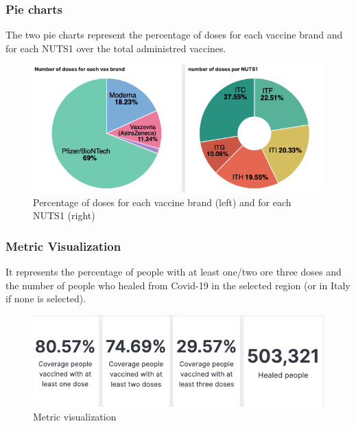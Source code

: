 \documentclass[12pt, a4paper]{article}
\begin{document}
\subsubsection{Pie charts}
The two pie charts represent the percentage of doses for each vaccine brand and for each NUTS1 over the total administred vaccines.
\begin{figure}[ht]
  \centering
  \includegraphics[width=1\linewidth]{img (7).png}
\caption*{Percentage of doses for each vaccine brand  (left) and for each NUTS1 (right)}
\end{figure}

\subsubsection{Metric Visualization}
It represents the percentage of people with at least one/two ore three doses and the 
number of people who healed from Covid-19 in the selected region (or in Italy if none 
is selected).
\begin{figure}[ht]
  \centering
  \includegraphics[width=.8\linewidth]{img (8).png}
\caption*{Metric visualization}
\end{figure}
\end{document}
